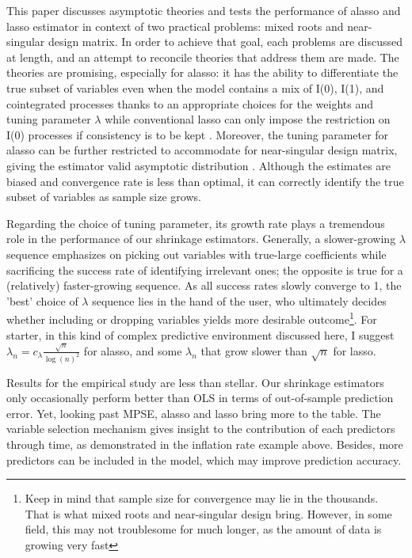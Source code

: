 \documentclass[12pt,a4paper]{article}
\begin{document}
This paper discusses asymptotic theories and tests the performance of alasso and lasso estimator in context of two practical problems: mixed roots and near-singular design matrix. In order to achieve that goal, each problems are discussed at length, and an attempt to reconcile theories that address them are made. The theories are promising, especially for alasso: it has the ability to differentiate the true subset of variables even when the model contains a mix of I(0), I(1), and cointegrated processes thanks to an appropriate choices for the weights and tuning parameter $ \lambda $ while conventional lasso can only impose the restriction on I(0) processes if consistency is to be kept \citep{lee2018lasso}. Moreover, the tuning parameter for alasso can be further restricted to accommodate for near-singular design matrix, giving the estimator valid asymptotic distribution \citep{knight2008shrinkage}. Although the estimates are biased and convergence rate is less than optimal, it can correctly identify the true subset of variables as sample size grows.

Regarding the choice of tuning parameter, its growth rate plays a tremendous role in the performance of our shrinkage estimators. Generally, a slower-growing $ \lambda $ sequence emphasizes on picking out variables with true-large coefficients while sacrificing the success rate of identifying irrelevant ones; the opposite is true for a (relatively) faster-growing sequence. As all success rates slowly converge to 1, the 'best' choice of $ \lambda $ sequence lies in the hand of the user, who ultimately decides whether including or dropping variables yields more desirable outcome\footnote{Keep in mind that sample size for convergence may lie in the thousands. That is what mixed roots and near-singular design bring. However, in some field, this may not troublesome for much longer, as the amount of data is growing very fast}.
For starter, in this kind of complex predictive environment discussed here, I suggest $ \lambda_n = c_\lambda \frac{\sqrt{n}}{\log(n)^2} $ for alasso, and some $ \lambda_n $ that grow slower than $ \sqrt{n} $ for lasso.

Results for the empirical study are less than stellar. Our shrinkage estimators only occasionally perform better than OLS in terms of out-of-sample prediction error. Yet, looking past MPSE, alasso and lasso bring more to the table. The variable selection mechanism gives insight to the contribution of each predictors through time, as demonstrated in the inflation rate example above. Besides, more predictors can be included in the model, which may improve prediction accuracy.
\end{document}
